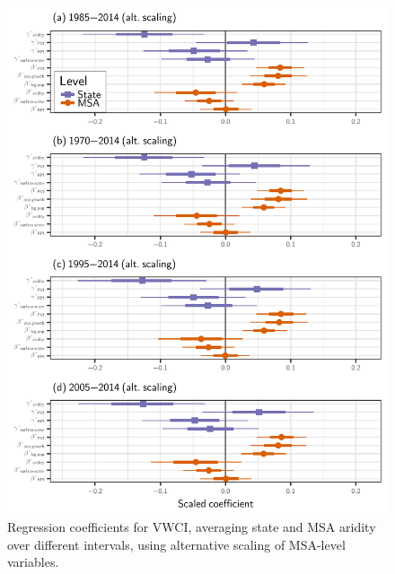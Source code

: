 \documentclass[draft]{agujournal}\usepackage{knitr}
\begin{document}
\begin{figure}
\includegraphics[width=6.25in]{figures_si/pooled_vwci_years_cat_plots-1} \caption[Regression coefficients for VWCI, averaging state and MSA aridity over different intervals, using alternative scaling of MSA-level variables]{Regression coefficients for VWCI, averaging state and MSA aridity over different intervals, using alternative scaling of MSA-level variables.}\label{fig:pooled_vwci_years_cat_plots}
\end{figure}



\end{document}
